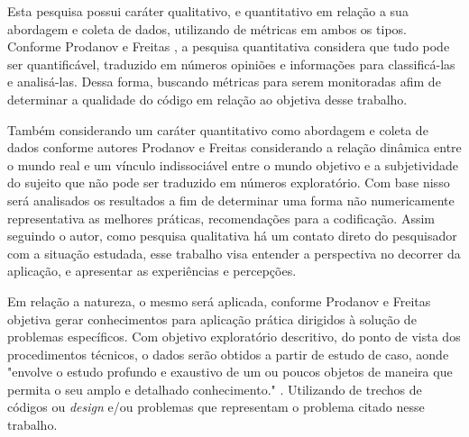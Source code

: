 \documentclass[12pt]{article}
\begin{document}
Esta pesquisa possui caráter qualitativo, e quantitativo em relação a sua abordagem e coleta de dados, utilizando de métricas em ambos os tipos. Conforme Prodanov e Freitas \cite{METOLOGIA}, a pesquisa quantitativa  considera que tudo pode ser quantificável, traduzido em números opiniões e informações para classificá-las e analisá-las. Dessa forma, buscando métricas para serem monitoradas afim de determinar a qualidade do código em relação ao objetiva desse trabalho.

Também considerando um caráter quantitativo como abordagem e coleta de dados conforme autores Prodanov e Freitas \cite{METOLOGIA} considerando a relação dinâmica entre o mundo real e um  vínculo  indissociável  entre  o  mundo  objetivo e  a  subjetividade  do  sujeito  que  não  pode  ser  traduzido  em  números
exploratório. Com base nisso será analisados os resultados a fim de determinar uma forma não numericamente representativa as melhores práticas, recomendações para a codificação. Assim seguindo o autor, como pesquisa qualitativa há um contato direto do pesquisador com a situação estudada, esse trabalho visa entender a perspectiva no decorrer da aplicação, e apresentar as experiências e percepções.

Em relação a natureza, o mesmo será aplicada, conforme Prodanov e Freitas \cite{METOLOGIA} objetiva gerar conhecimentos para aplicação prática dirigidos à solução de problemas específicos. Com objetivo exploratório descritivo, do ponto de vista dos procedimentos técnicos, o dados serão obtidos a partir de estudo de caso, aonde "envolve  o  estudo  profundo  e  exaustivo  de  um  ou  poucos  objetos  de  maneira  que  permita  o  seu  amplo  e  detalhado  conhecimento." \cite{METOLOGIA}. Utilizando de trechos de códigos ou \textit{design} e/ou problemas que representam o problema citado nesse trabalho.






%


\end{document}
